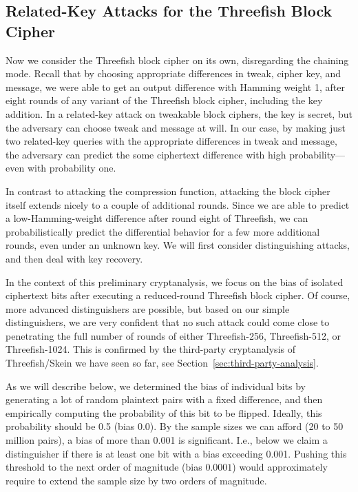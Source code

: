 \documentclass[11pt,twoside]{article}
\begin{document}
\subsection{Related-Key Attacks for the Threefish Block Cipher}
  \label{sec:related-key-attacks}

Now we consider the Threefish block cipher on its own, disregarding the chaining mode. Recall that by choosing appropriate differences in tweak, cipher key, and message, we were able to get an output difference with Hamming weight 1, after eight rounds of any variant of the Threefish block cipher, including the key addition.  In a related-key attack on tweakable block ciphers, the key is secret, but the adversary can choose tweak and message at will. In our case, by making just two related-key queries with the appropriate differences in tweak and message, the adversary can predict the some ciphertext difference with high probability---even with probability one. 

In contrast to attacking the compression function, attacking the block cipher itself extends nicely to a couple of additional rounds. Since we are able to predict a low-Hamming-weight difference after round eight of Threefish, we can probabilistically predict the differential behavior for a few more additional rounds, even under an unknown key. We will first consider distinguishing attacks, and then deal with key recovery. 

In the context of this preliminary cryptanalysis, we focus on the bias of
isolated ciphertext bits after executing a reduced-round Threefish block
cipher. Of course, more advanced distinguishers are possible, but based on our
simple distinguishers, we are very confident that no such attack could come
close to penetrating the full number of rounds of either Threefish-256,
Threefish-512, or Threefish-1024. This is confirmed by the third-party
cryptanalysis of Threefish/Skein we have seen so far, see
Section~\ref{sec:third-party-analysis}. 

As we will describe below, we determined the bias of individual bits by
generating a lot of random plaintext pairs with a fixed difference, and then
empirically computing the probability of this bit to be flipped. Ideally, this
probability should be 0.5 (bias 0.0). By the sample sizes we can afford (20 to
50 million pairs), a bias of more than 0.001 is significant. I.e., below we
claim a distinguisher if there is at least one bit with a bias exceeding
0.001. Pushing this threshold to the next order of magnitude (bias $0.0001$)
would approximately require to extend the sample size by two orders of
magnitude. 
\end{document}
